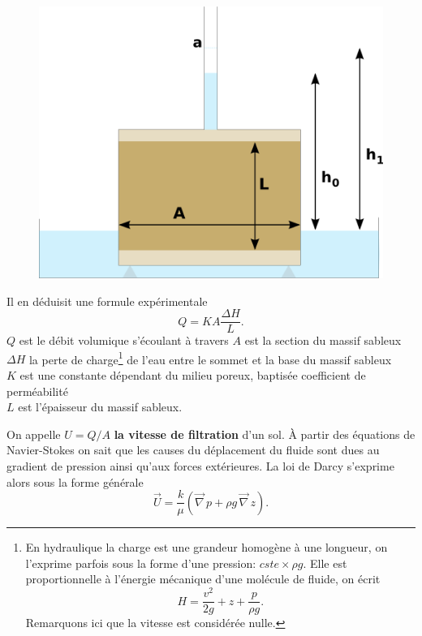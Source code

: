 \documentclass[a4paper,11pt]{article}
\numberwithin{equation}{section}
\begin{document}
\begin{figure}[H]
	\label{fig-Darcy}
	\begin{center}
		\includegraphics[scale=0.4]{darcy.png}
	\end{center}
\end{figure}

Il en déduisit une formule expérimentale
\begin{equation}
	\label{eq-Darcy-1}
	Q=KA\frac{\Delta H}{L}.
\end{equation}
$Q$ est le débit volumique s'écoulant à travers  
$A$ est la section du massif sableux\\
$\Delta H$ la perte de charge\footnote{En hydraulique la charge est une grandeur homogène à une longueur, on l'exprime parfois sous la forme d'une pression: $cste\times\rho g$. Elle est proportionnelle à l'énergie mécanique d'une molécule de fluide, on écrit \[H=\frac{v^2}{2g}+ z+ \frac{p}{\rho g}.\] Remarquons ici que la vitesse est considérée nulle.} de l'eau entre le sommet et la base du massif sableux\\
$K$ est une constante dépendant du milieu poreux, baptisée coefficient de perméabilité\\
$L$ est l'épaisseur du massif sableux.



\vspace{0.7cm}

On appelle $U=Q/A$ \textbf{la vitesse de filtration} d'un sol. À partir des équations de Navier-Stokes on sait que les causes du déplacement du fluide sont dues au gradient de pression ainsi qu'aux forces extérieures. La loi de Darcy s'exprime alors sous la forme générale
\begin{equation}
	\label{eq-Darcy}
	\overrightarrow{U}=\frac{k}{\mu }(\overrightarrow{\nabla}\, p+\rho g \,\overrightarrow{\nabla}\, z).
\end{equation} 
\end{document}
